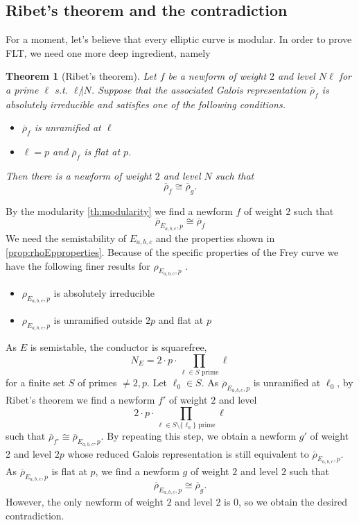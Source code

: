 \documentclass{article}
\theoremstyle{plain}%
\newtheorem{theorem}{Theorem}[section]
\theoremstyle{definition}
\theoremstyle{remark}
\begin{document}
\subsection{Ribet's theorem and the contradiction}
For a moment, let's believe that every elliptic curve is modular.
In order to prove FLT, we need one more deep ingredient, namely
\begin{theorem}[Ribet's theorem]
    Let \(f\) be a newform of weight \(2\) and level \(N\ell\) for a prime \(\ell\) s.t. \(\ell\not | N\).
    Suppose that the associated Galois representation \(\overline{\rho}_f\) is absolutely irreducible
    and satisfies one of the following conditions.
    \begin{itemize}
        \item \(\overline{\rho}_f\) is unramified at \(\ell\)
        \item \(\ell = p\) and \(\overline{\rho}_f\) is flat at \(p\).
    \end{itemize}
    Then there is a newform of weight \(2\) and level \(N\) such that
    \[
        \overline{\rho}_f \cong \overline{\rho}_g.
    \]    
\end{theorem}
By the modularity \cref{th:modularity} we find a newform \(f\) of weight \(2\) such that
\[
    \overline{\rho}_{E_{a,b,c}, p} \cong \overline{\rho}_f
\]
We need the semistability of \(E_{a,b,c}\) and the properties shown in \cref{prop:rhoEpproperties}.
Because of the specific properties of the Frey curve we have the following finer results for \(\rho_{E_{a,b,c}, p}\) 
\cite[see][chapter 1, theorem 3.1]{Cornell1997}.
\begin{itemize}
    \item \(\rho_{E_{a,b,c}, p}\) is absolutely irreducible
    \item \(\rho_{E_{a,b,c}, p}\) is unramified outside \(2p\) and flat at \(p\) %
\end{itemize} %
As \(E\) is semistable, the conductor is squarefree,
\[ 
    N_E = 2 \cdot p \cdot \prod_{\ell\in S \text{ prime}} \ell
\]
for a finite set \(S\) of primes \(\neq 2, p\).
Let \(\ell_0 \in S\). As \(\overline{\rho}_{E_{a,b,c}, p}\) is unramified at \(\ell_0\), 
by Ribet's theorem we find a newform \(f'\) of weight \(2\) and level
\[
    2 \cdot p \cdot \prod_{\ell\in S\setminus\{\ell_0\} \text{ prime}} \ell
\]
such that \(\overline{\rho}_{f'} \cong \overline{\rho}_{E_{a,b,c}, p}\).
By repeating this step, we obtain a newform \(g'\) of weight 2 and level \(2p\) whose reduced 
Galois representation is still equivalent to \(\overline{\rho}_{E_{a,b,c}, p}\). 
As \(\overline{\rho}_{E_{a,b,c}, p}\) is flat at \(p\), 
we find a newform \(g\) of weight \(2\) and level \(2\) such that
\[
    \overline{\rho}_{E_{a,b,c}, p} \cong \overline{\rho}_g.    
\]
However, the only newform of weight \(2\) and level \(2\) is 0, so we obtain the desired contradiction.
\end{document}
